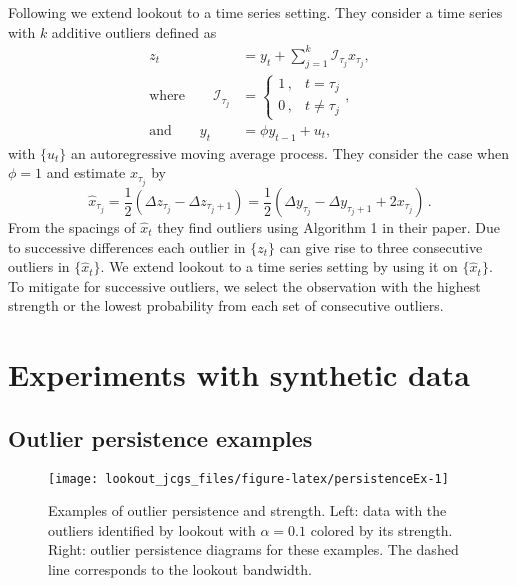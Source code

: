 \documentclass[12pt]{article}
\theoremstyle{definition}
\theoremstyle{definition}
\theoremstyle{definition}
\theoremstyle{definition}
\theoremstyle{remark}
\begin{document}
\color{blue} Following \citet{Burridge2006} we extend lookout to a time series setting. They consider a time series with \(k\) additive outliers defined as
\begin{align*}
z_t & = y_t + \sum_{j=1}^k \mathcal{I}_{\tau_j} x_{\tau_j} , \\
\text{where}\qquad
  \mathcal{I}_{\tau_j} &=  \begin{cases}
      1\, , & t = \tau_j \\
      0\, ,  & t \neq \tau_j
   \end{cases} , \\
\text{and}\qquad
y_t &= \phi y_{t-1} + u_t ,
\end{align*}
with \(\{u_t\}\) an autoregressive moving average process. They consider the case when \(\phi = 1\) and estimate \(x_{\tau_j}\) by
\[ \hat{x}_{\tau_j} = \frac{1}{2}\left(\Delta z_{\tau_j} - \Delta z_{\tau_j +1}  \right)  = \frac{1}{2}\left(\Delta y_{\tau_j} - \Delta y_{\tau_j +1}  + 2 x_{\tau_j}\right) \, .\]
From the spacings of \(\hat{x}_{t}\) they find outliers using Algorithm 1 in their paper. Due to successive differences each outlier in \(\{z_{t}\}\) can give rise to three consecutive outliers in \(\{\hat{x}_{t}\}\). We extend lookout to a time series setting by using it on \(\{\hat{x}_{t}\}\). To mitigate for successive outliers, we select the observation with the highest strength or the lowest probability from each set of consecutive outliers.

\color{black}

\hypertarget{sec:simulations}{%
\section{Experiments with synthetic data}\label{sec:simulations}}

\hypertarget{sec:PersistenceExamples}{%
\subsection{Outlier persistence examples}\label{sec:PersistenceExamples}}

\begin{figure}
\texttt{[image: lookout\_jcgs\_files/figure-latex/persistenceEx-1]} \caption{Examples of outlier persistence and strength. Left: data with the outliers identified by lookout with $\alpha = 0.1$ colored by its strength. Right: outlier persistence diagrams for these examples. The dashed line corresponds to the lookout bandwidth.}\label{fig:persistenceEx}
\end{figure}
\end{document}
